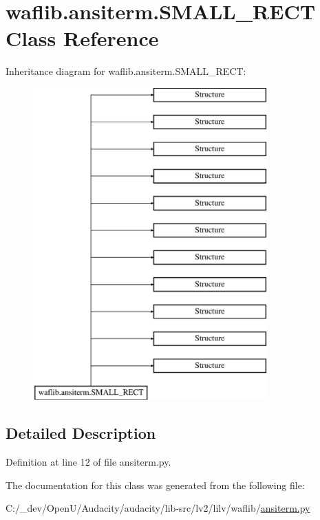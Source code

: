\hypertarget{classwaflib_1_1ansiterm_1_1_s_m_a_l_l___r_e_c_t}{}\section{waflib.\+ansiterm.\+S\+M\+A\+L\+L\+\_\+\+R\+E\+CT Class Reference}
\label{classwaflib_1_1ansiterm_1_1_s_m_a_l_l___r_e_c_t}
Inheritance diagram for waflib.\+ansiterm.\+S\+M\+A\+L\+L\+\_\+\+R\+E\+CT\+:\begin{figure}[H]
\begin{center}
\leavevmode
\includegraphics[height=12.000000cm]{classwaflib_1_1ansiterm_1_1_s_m_a_l_l___r_e_c_t}
\end{center}
\end{figure}


\subsection{Detailed Description}


Definition at line 12 of file ansiterm.\+py.



The documentation for this class was generated from the following file\+:\begin{DoxyCompactItemize}
\item 
C\+:/\+\_\+dev/\+Open\+U/\+Audacity/audacity/lib-\/src/lv2/lilv/waflib/\hyperlink{lilv_2waflib_2ansiterm_8py}{ansiterm.\+py}\end{DoxyCompactItemize}
